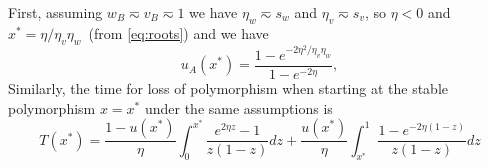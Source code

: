 \documentclass[14pt]{extarticle}
\begin{document}
First, assuming $w_B \eqsim v_B \eqsim 1$ we have $\eta_w \eqsim s_w$ and $\eta_v \eqsim s_v$, so $\eta<0$ and $x^*=\eta / \eta_v \eta_w$~(from \eqref{eq:roots}) and we have
\begin{equation} \label{eq:uA(x*)}
u_A(x^*) = \frac{1-e^{-2 \eta^2/\eta_v \eta_w}}{1-e^{-2\eta}},
\end{equation}
Similarly, the time for loss of polymorphism when starting at the stable polymorphism $x=x^*$ under the same assumptions is
\begin{equation} \label{eq:T(x*)}
T(x^*) = 
\frac{1-u(x^*)}{\eta} \int_0^{x^*}{\frac{e^{2 \eta z} - 1}{z(1-z)} dz} + 
\frac{u(x^*)}{\eta} \int_{x^*}^1{\frac{1-e^{-2 \eta (1-z)}}{z(1-z)} dz}
\end{equation}






%
\end{document}
